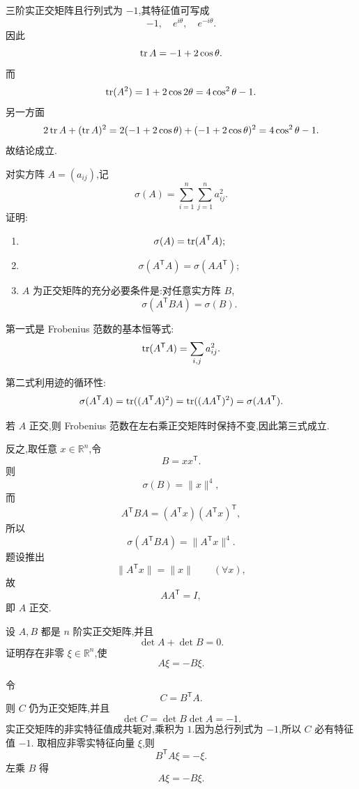 \begin{solution}
三阶实正交矩阵且行列式为 $-1$,其特征值可写成
\[
-1,
\quad
e^{i\theta},
\quad
e^{-i\theta}.
\]
因此
\[
\operatorname{tr} A=-1+2\cos\theta.
\]
而
\[
\operatorname{tr}(A^2)
=1+2\cos2\theta
=4\cos^2\theta-1.
\]
另一方面
\[
2\operatorname{tr} A+(\operatorname{tr} A)^2
=2(-1+2\cos\theta)+(-1+2\cos\theta)^2
=4\cos^2\theta-1.
\]
故结论成立.
\end{solution}


\begin{example}
对实方阵 $A=(a_{ij})$,记
\[
\sigma(A)=\sum\limits_{i=1}^{n}\sum\limits_{j=1}^{n}a_{ij}^2.
\]
证明:
\begin{enumerate}
    \item
    \[
    \sigma(A)=\operatorname{tr}(A^{\mathsf T}A);
    \]
    \item
    \[
    \sigma(A^{\mathsf T}A)=\sigma(AA^{\mathsf T});
    \]
    \item $A$ 为正交矩阵的充分必要条件是:对任意实方阵 $B$,
    \[
    \sigma(A^{\mathsf T}BA)=\sigma(B).
    \]
\end{enumerate}
\end{example}
\exampleblank

\begin{solution}
第一式是 Frobenius 范数的基本恒等式:
\[
\operatorname{tr}(A^{\mathsf T}A)
=
\sum_{i,j}a_{ij}^2.
\]

第二式利用迹的循环性:
\[
\sigma(A^{\mathsf T}A)
=
\operatorname{tr}((A^{\mathsf T}A)^2)
=
\operatorname{tr}((AA^{\mathsf T})^2)
=
\sigma(AA^{\mathsf T}).
\]

若 $A$ 正交,则 Frobenius 范数在左右乘正交矩阵时保持不变,因此第三式成立.

反之,取任意 $x\in\mathbb{R}^n$,令
\[
B=xx^{\mathsf T}.
\]
则
\[
\sigma(B)=\|x\|^4,
\]
而
\[
A^{\mathsf T}BA
=(A^{\mathsf T}x)(A^{\mathsf T}x)^{\mathsf T},
\]
所以
\[
\sigma(A^{\mathsf T}BA)
=
\|A^{\mathsf T}x\|^4.
\]
题设推出
\[
\|A^{\mathsf T}x\|=\|x\|
\qquad(\forall x),
\]
故
\[
AA^{\mathsf T}=I,
\]
即 $A$ 正交.
\end{solution}


\begin{example}
设 $A,B$ 都是 $n$ 阶实正交矩阵,并且
\[
\det A+\det B=0.
\]
证明存在非零 $\xi\in\mathbb{R}^n$,使
\[
A\xi=-B\xi.
\]
\end{example}
\exampleblank

\begin{solution}
令
\[
C=B^{\mathsf T}A.
\]
则 $C$ 仍为正交矩阵,并且
\[
\det C
=
\det B\det A
=-1.
\]
实正交矩阵的非实特征值成共轭对,乘积为 $1$.因为总行列式为 $-1$,所以 $C$ 必有特征值 $-1$.
取相应非零实特征向量 $\xi$,则
\[
B^{\mathsf T}A\xi=-\xi.
\]
左乘 $B$ 得
\[
\boxed{A\xi=-B\xi}.
\]
\end{solution}


